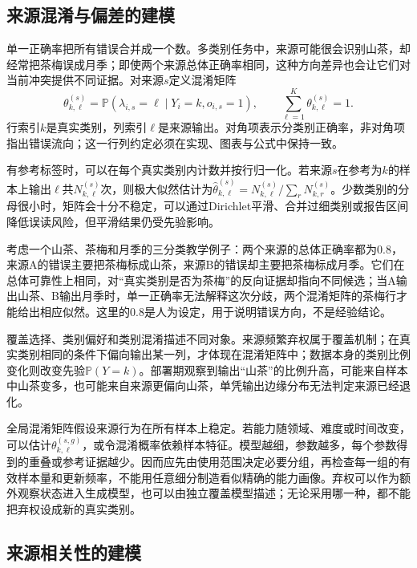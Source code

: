 \subsection{来源混淆与偏差的建模}
\label{sec:knowledge-fusion-confusion}

单一正确率把所有错误合并成一个数。多类别任务中，来源可能很会识别山茶，却经常把茶梅误成月季；即使两个来源总体正确率相同，这种方向差异也会让它们对当前冲突提供不同证据。对来源$s$定义混淆矩阵
\begin{equation}
  \theta^{(s)}_{k,\ell}
  =\mathbb{P}(\lambda_{i,s}=\ell
    \mid Y_i=k,o_{i,s}=1),
  \qquad
  \sum_{\ell=1}^{K}\theta^{(s)}_{k,\ell}=1.
  \label{eq:knowledge-fusion-confusion-matrix}
\end{equation}
行索引$k$是真实类别，列索引$\ell$是来源输出。对角项表示分类别正确率，非对角项指出错误流向；这一行列约定必须在实现、图表与公式中保持一致。

有参考标签时，可以在每个真实类别内计数并按行归一化。若来源$s$在参考为$k$的样本上输出$\ell$共$N^{(s)}_{k,\ell}$次，则极大似然估计为$\widehat\theta^{(s)}_{k,\ell}=N^{(s)}_{k,\ell}/\sum_{r}N^{(s)}_{k,r}$。少数类别的分母很小时，矩阵会十分不稳定，可以通过Dirichlet平滑、合并过细类别或报告区间降低误读风险，但平滑结果仍受先验影响。

考虑一个山茶、茶梅和月季的三分类教学例子：两个来源的总体正确率都为$0.8$，来源A的错误主要把茶梅标成山茶，来源B的错误却主要把茶梅标成月季。它们在总体可靠性上相同，对“真实类别是否为茶梅”的反向证据却指向不同候选；当A输出山茶、B输出月季时，单一正确率无法解释这次分歧，两个混淆矩阵的茶梅行才能给出相应似然。这里的$0.8$是人为设定，用于说明错误方向，不是经验结论。

覆盖选择、类别偏好和类别混淆描述不同对象。来源频繁弃权属于覆盖机制；在真实类别相同的条件下偏向输出某一列，才体现在混淆矩阵中；数据本身的类别比例变化则改变先验$\mathbb{P}(Y=k)$。部署期观察到输出“山茶”的比例升高，可能来自样本中山茶变多，也可能来自来源更偏向山茶，单凭输出边缘分布无法判定来源已经退化。

全局混淆矩阵假设来源行为在所有样本上稳定。若能力随领域、难度或时间改变，可以估计$\theta^{(s,g)}_{k,\ell}$，或令混淆概率依赖样本特征。模型越细，参数越多，每个参数得到的重叠或参考证据越少。因而应先由使用范围决定必要分组，再检查每一组的有效样本量和更新频率，不能用任意细分制造看似精确的能力画像。弃权可以作为额外观察状态进入生成模型，也可以由独立覆盖模型描述；无论采用哪一种，都不能把弃权设成新的真实类别。

\subsection{来源相关性的建模}
\label{sec:knowledge-fusion-correlation}

